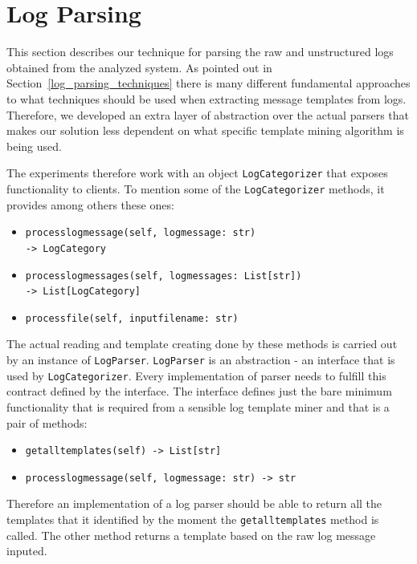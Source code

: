 \newpage

\section{Log Parsing}
This section describes our technique for parsing the raw and unstructured logs obtained from the analyzed system.
As pointed out in Section~\ref{log_parsing_techniques} there is many different fundamental approaches to what techniques should be used when extracting message templates from logs. 
Therefore, we developed an extra layer of abstraction over the actual parsers that makes our solution less dependent on what specific template mining algorithm is being used.

The experiments therefore work with an object \texttt{LogCategorizer} that exposes functionality to clients. To mention some of the \texttt{LogCategorizer} methods, it provides among others these ones:

\begin{itemize}
    \item \texttt{process\textunderscore log\textunderscore message(self, log\textunderscore message: str)\\ -> LogCategory}
    \item \texttt{process\textunderscore log\textunderscore messages(self, log\textunderscore messages: List[str])\\ -> List[LogCategory]}
    \item \texttt{process\textunderscore file(self, input\textunderscore file\textunderscore name: str)}
\end{itemize}

The actual reading and template creating done by these methods is carried out by an instance of \texttt{LogParser}. \texttt{LogParser} is an abstraction - an interface that is used by \texttt{LogCategorizer}. Every implementation of parser needs to fulfill this contract defined by the interface. The interface defines just the bare minimum functionality that is required from a sensible log template miner and that is a pair of methods:
\begin{itemize}
    \item \texttt{get\textunderscore all\textunderscore templates(self) -> List[str]}
    \item \texttt{process\textunderscore log\textunderscore message(self, log\textunderscore message: str) -> str}
\end{itemize}
Therefore an implementation of a log parser should be able to return all the templates that it identified by the moment the \texttt{get\textunderscore all\textunderscore templates} method is called. The other method returns a template based on the raw log message inputed.\\

